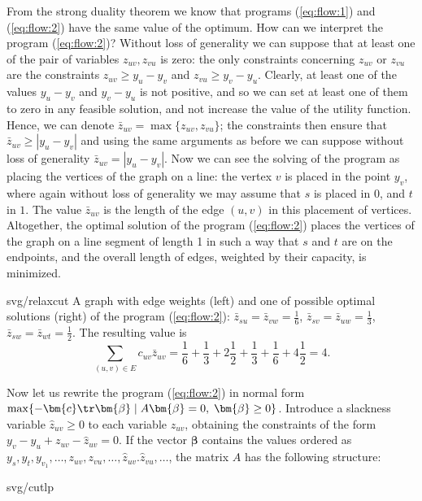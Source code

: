 \noindent
From the strong duality theorem we know that programs (\ref{eq:flow:1}) and (\ref{eq:flow:2})
have the same value of the optimum. How can we interpret the  program  (\ref{eq:flow:2})?
Without loss of generality we can suppose that at least one of the pair of variables  $z_{uv},z_{vu}$
is zero: the only constraints concerning  $z_{uv}$ or $z_{vu}$ are the constraints
$z_{uv}\ge y_u-y_v$ and $z_{vu}\ge y_v-y_u$. Clearly, at least one of the values 
 $y_u-y_v$ and  $y_v-y_u$ is not positive, and so we can set at least one of them to zero in any feasible solution,
and not increase the value of the utility function. Hence, we can denote $\bar{z}_{uv}=\max\{z_{uv},z_{vu}\}$;
the constraints then ensure that $\bar{z}_{uv}\ge|y_u-y_v|$ and using the same arguments as before we can
suppose without loss of generality  $\bar{z}_{uv}=|y_u-y_v|$.
Now we can see the  solving of the program as placing the vertices of the graph on a line: the vertex $v$
is placed in the point $y_v$, where again without loss of generality we may assume that $s$ is placed in $0$, and
$t$ in $1$. The value  $\bar{z}_{uv}$ is the length of the edge $(u,v)$ in this placement of vertices.
Altogether, the optimal solution of the program  (\ref{eq:flow:2}) places the vertices of the graph on a line
segment of length 1 in such a way that $s$ and $t$ are on the endpoints, and the overall length 
of edges, weighted by their capacity, is minimized.

\begin{myfig}{0.9\textwidth}{svg/relaxcut}
  A graph with edge weights (left) and one of possible optimal solutions (right) of the program
  (\ref{eq:flow:2}):
  $\bar{z}_{su}=\bar{z}_{vw}=\frac{1}{6}$, $\bar{z}_{sv}=\bar{z}_{uw}=\frac{1}{3}$,
  $\bar{z}_{sw}=\bar{z}_{wt}=\frac{1}{2}$. The resulting value is
  $$\sum_{(u,v)\in E}c_{uv}\bar{z}_{uv}=\frac{1}{6}+\frac{1}{3}+2\frac{1}{2}+\frac{1}{3}+\frac{1}{6}+4\frac{1}{2}=4.$$
\end{myfig}

\noindent
Now let us rewrite the program  (\ref{eq:flow:2}) in normal form 
$\max\{-\bm{c}\tr\bm{\beta}\mid A\bm{\beta}=0,\;\bm{\beta}\ge0\}$.
Introduce a slackness variable $\hat{z}_{uv}\ge 0$ to each variable  $z_{uv}$, obtaining the
constraints of the form  \hbox{$y_v-y_u+z_{uv}-\hat{z}_{uv}=0$}.
If the vector  $\bm{\beta}$ contains the values ordered as  
$y_s,y_t,y_{v_1},\ldots,z_{uv},z_{vu},\ldots,\hat{z}_{uv}.\hat{z}_{vu},\ldots$, 
the matrix $A$ has the following structure:

\begin{myfig}{0.8\textwidth}{svg/cutlp}
\end{myfig}

